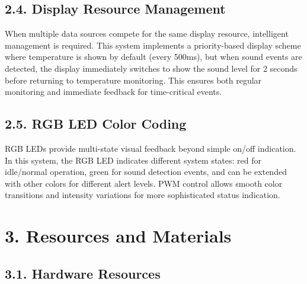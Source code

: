 \documentclass[12pt]{article}
\begin{document}
\subsection*{2.4. Display Resource Management}

When multiple data sources compete for the same display resource, intelligent management is required. This system implements a priority-based display scheme where temperature is shown by default (every 500ms), but when sound events are detected, the display immediately switches to show the sound level for 2 seconds before returning to temperature monitoring. This ensures both regular monitoring and immediate feedback for time-critical events.

\subsection*{2.5. RGB LED Color Coding}

RGB LEDs provide multi-state visual feedback beyond simple on/off indication. In this system, the RGB LED indicates different system states: red for idle/normal operation, green for sound detection events, and can be extended with other colors for different alert levels. PWM control allows smooth color transitions and intensity variations for more sophisticated status indication.

\section*{3. Resources and Materials}

\subsection*{3.1. Hardware Resources}
\end{document}
